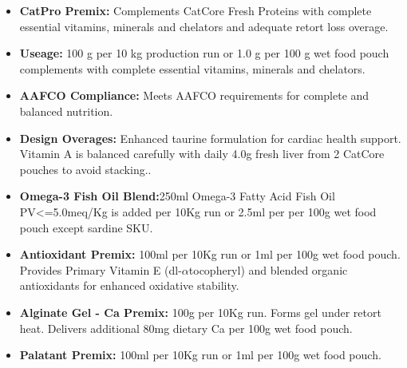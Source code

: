 \vspace{1em}

\begin{itemize}
\item \textbf{CatPro Premix: } Complements CatCore Fresh Proteins with complete essential vitamins, minerals and chelators and adequate retort loss overage.
\item \textbf{Useage:} 100 g per 10 kg production run or 1.0 g per 100 g wet food pouch complements with complete essential vitamins, minerals and chelators. \item\textbf{AAFCO Compliance: } Meets AAFCO requirements for complete and balanced nutrition.
\item\textbf{Design Overages: }Enhanced taurine formulation for cardiac health support. Vitamin A is balanced carefully with daily 4.0g fresh liver from 2 CatCore pouches to avoid stacking.\cite{ref64}.  
\item \textbf{Omega-3 Fish Oil Blend:}250ml Omega-3 Fatty Acid Fish Oil PV<=5.0meq/Kg is added per 10Kg run or 2.5ml per per 100g wet food pouch except sardine SKU.
\item \textbf{Antioxidant Premix: } 100ml per 10Kg run or 1ml per 100g wet food pouch. Provides Primary Vitamin E (dl-$\alpha$tocopheryl) and blended organic antioxidants for enhanced oxidative stability.
\item \textbf{Alginate Gel - Ca Premix:} 100g per 10Kg run.  Forms gel under retort heat. Delivers additional 80mg dietary Ca per 100g wet food pouch.
\item \textbf{Palatant Premix: } 100ml per 10Kg run or 1ml per 100g wet food pouch.
\end{itemize}
